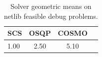\begin{table}
\centering
\caption{Solver geometric means on netlib feasible debug problems.}
\label{t-netlib feasible debug-geom_mean}
\begin{tabular}{lccc}
\toprule
 SCS &  OSQP &  COSMO \\
\midrule
1.00 &  2.50 &   5.10 \\
\bottomrule
\end{tabular}
\end{table}
